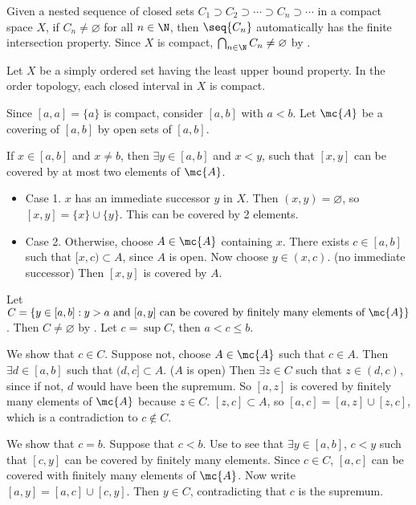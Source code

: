 \rmk Given a nested sequence of closed sets \(C_1 \supset C_2 \supset \cdots \supset C_n \supset \cdots\) in a compact space \(X\), if \(C_n \neq \varnothing\) for all \(n \in \N\), then \(\seq{C_n}\) automatically has the finite intersection property. Since \(X\) is compact, \(\bigcap_{n \in \N} C_n \neq \varnothing\) by .


 Let \(X\) be a simply ordered set having the least upper bound property. In the order topology, each closed interval in \(X\) is compact.

\pf Since \([a, a] = \{a\}\) is compact, consider \([a, b]\) with \(a < b\). Let \(\mc{A}\) be a covering of \([a, b]\) by open sets of \([a, b]\).

 If \(x \in [a, b]\) and \(x \neq b\), then \(\exists y \in [a, b]\) and \(x < y\), such that \([x, y]\) can be covered by at most two elements of \(\mc{A}\).
\begin{itemize}
    \item Case 1. \(x\) has an immediate successor \(y\) in \(X\). Then \((x, y) = \varnothing\), so \([x, y] = \{x\} \cup \{y\}\). This can be covered by 2 elements.
    \item Case 2. Otherwise, choose \(A \in \mc{A}\) containing \(x\). There exists \(c \in [a, b]\) such that \([x, c) \subset A\), since \(A\) is open. Now choose \(y \in (x, c)\). (no immediate successor) Then \([x, y]\) is covered by \(A\).
\end{itemize}
 Let \(C = \{y \in [a, b] : y > a \text{ and } [a, y] \text{ can be covered by finitely many elements of } \mc{A}\}\). Then \(C \neq \varnothing\) by . Let \(c = \sup C\), then \(a < c \leq b\).

 We show that \(c \in C\). Suppose not, choose \(A \in \mc{A}\) such that \(c \in A\). Then \(\exists d \in [a, b]\) such that \((d,c] \subset A\). (\(A\) is open) Then \(\exists z \in C\) such that \(z \in (d, c)\), since if not, \(d\) would have been the supremum. So \([a, z]\) is covered by finitely many elements of \(\mc{A}\) because \(z \in C\). \([z, c] \subset A\), so \([a, c] = [a, z] \cup [z, c]\), which is a contradiction to \(c \notin C\).

 We show that \(c = b\). Suppose that \(c < b\). Use  to see that \(\exists y \in [a, b]\), \(c < y\) such that \([c, y]\) can be covered by finitely many elements. Since \(c \in C\), \([a, c]\) can be covered with finitely many elements of \(\mc{A}\). Now write \([a, y] = [a, c] \cup [c, y]\). Then \(y \in C\), contradicting that \(c\) is the supremum.


